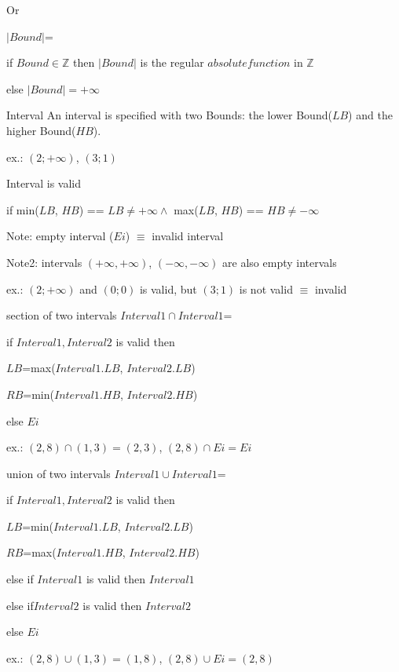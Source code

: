 	Or
	
\begin{definition}{$|Bound|$=}
	
	if $Bound \in  \mathbb{Z}$ then $|Bound|$ is the regular $absolute function$ in $\mathbb{Z}$
	
	else $|Bound| = +\infty$
\end{definition}

\begin{definition}{Interval}
	An interval is specified with two Bounds: the lower Bound($LB$) and the higher Bound($HB$).
	
	ex.: $(2;+\infty)$, $(3;1)$
\end{definition}

\begin{definition}{Interval is valid}
	
	if min($LB$, $HB$) == $LB \neq +\infty \land$ max($LB$, $HB$) == $HB  \neq -\infty$
	
	Note: empty interval ($Ei$) $\equiv$ invalid interval
	
	Note2: intervals $(+\infty, +\infty)$, $(-\infty, -\infty)$ are also empty intervals 
	
	ex.: $(2;+\infty)$ and $(0;0)$ is valid, but $(3;1)$ is not valid $\equiv$ invalid
\end{definition}

\begin{definition}{section of two intervals $Interval1 \cap Interval1$=}
	
	if $Interval1, Interval2$ is valid then 
	
	$LB$=max($Interval1.LB$, $Interval2.LB$)
	
	$RB$=min($Interval1.HB$, $Interval2.HB$)
	
	else $Ei$
	
	ex.: $(2,8)\cap(1,3)=(2,3)$, $(2,8)\cap Ei=Ei$
\end{definition}

\begin{definition}{union of two intervals $Interval1 \cup Interval1$=}
	
	if $Interval1, Interval2$ is valid then 
	
	$LB$=min($Interval1.LB$, $Interval2.LB$)
	
	$RB$=max($Interval1.HB$, $Interval2.HB$)
	
	else if $Interval1$ is valid then $Interval1$
	
	else if$ Interval2$ is valid then $Interval2$
	
	else $Ei$
	  
	ex.: $(2,8)\cup(1,3)=(1,8)$, $(2,8)\cup Ei=(2,8)$
\end{definition}

